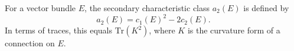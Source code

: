 For a vector bundle $E$, the secondary characteristic class $a_2(E)$ is defined by
$$
a_2(E) = c_1(E)^2 - 2c_2(E).
$$
In terms of traces, this equals $\text{Tr}(K^2)$, where $K$ is the curvature form of a connection on $E$.
